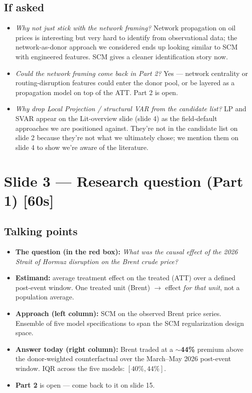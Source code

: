 \documentclass[11pt,a4paper]{article}
\newcommand{\timetag}[1]{\hfill\textcolor{muted}{\small[#1]}}
\newcommand{\highlight}[1]{\textcolor{accent}{\textbf{#1}}}
\begin{document}
\subsection{If asked}
\begin{itemize}
  \item \textit{Why not just stick with the network framing?} Network propagation on oil prices is interesting but very hard to identify from observational data; the network-as-donor approach we considered ends up looking similar to SCM with engineered features. SCM gives a cleaner identification story now.
  \item \textit{Could the network framing come back in Part 2?} Yes --- network centrality or routing-disruption features could enter the donor pool, or be layered as a propagation model on top of the ATT. Part 2 is open.
  \item \textit{Why drop Local Projection / structural VAR from the candidate list?} LP and SVAR appear on the Lit-overview slide (slide 4) as the field-default approaches we are positioned against. They're not in the candidate list on slide 2 because they're not what we ultimately chose; we mention them on slide 4 to show we're aware of the literature.
\end{itemize}

\section{Slide 3 --- Research question (Part 1) \timetag{60s}}

\subsection{Talking points}
\begin{itemize}
  \item \highlight{The question (in the red box):} \emph{What was the causal effect of the 2026 Strait of Hormuz disruption on the Brent crude price?}
  \item \highlight{Estimand:} average treatment effect on the treated (ATT) over a defined post-event window. One treated unit (Brent) $\to$ effect \emph{for that unit}, not a population average.
  \item \highlight{Approach (left column):} SCM on the observed Brent price series. Ensemble of five model specifications to span the SCM regularization design space.
  \item \highlight{Answer today (right column):} Brent traded at a \highlight{$\sim$44\%} premium above the donor-weighted counterfactual over the March--May 2026 post-event window. IQR across the five models: $[40\%, 44\%]$.
  \item \highlight{Part 2} is open --- come back to it on slide 15.
\end{itemize}
\end{document}
